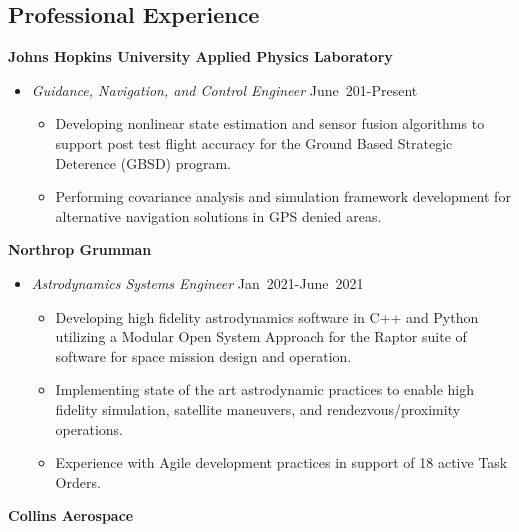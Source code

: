 \subsection*{Professional Experience}
{}

\textbf{Johns Hopkins University Applied Physics Laboratory}
\begin{itemize}
    \item [] \textit{Guidance, Navigation, and Control Engineer} \hfill {June~201-Present}
        \begin{itemize}
            \item Developing nonlinear state estimation and sensor fusion algorithms to support post test flight accuracy for the Ground Based Strategic Deterence (GBSD) program.
            \item Performing covariance analysis and simulation framework development for alternative navigation solutions in GPS denied areas.
        \end{itemize}
\end{itemize}

\textbf{Northrop Grumman}

\begin{itemize}
    \item[] \textit{Astrodynamics Systems Engineer} \hfill {Jan~2021-June~2021}
        \begin{itemize}
            \item Developing high fidelity astrodynamics software in C++ and Python utilizing a Modular Open System Approach for the Raptor suite of software for space mission design and operation. 
            \item Implementing state of the art astrodynamic practices to enable high fidelity simulation, satellite maneuvers, and rendezvous/proximity operations. 
            \item Experience with Agile development practices in support of 18 active Task Orders. 
        \end{itemize}
\end{itemize}
\textbf{Collins Aerospace}

